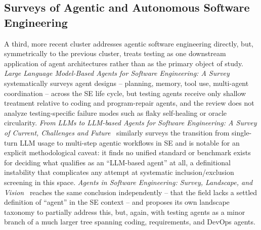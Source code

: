 \subsection{Surveys of Agentic and Autonomous Software Engineering}
\label{subsec:prior-surveys-agentic}

A third, more recent cluster addresses agentic software engineering
directly, but, symmetrically to the previous cluster, treats testing
as one downstream application of agent architectures rather than as
the primary object of study. \emph{Large Language
Model-Based Agents for Software Engineering: A Survey}~\cite{slr0042024} systematically
surveys agent designs -- planning, memory, tool use, multi-agent
coordination -- across the SE life cycle, but testing agents receive
only shallow treatment relative to coding and program-repair agents,
and the review does not analyze testing-specific failure modes such
as flaky self-healing or oracle circularity. \emph{From LLMs to LLM-based Agents for Software Engineering: A
Survey of Current, Challenges and Future}~\cite{slr0052024} similarly surveys the
transition from single-turn LLM usage to multi-step agentic workflows
in SE and is notable for an explicit methodological caveat: it finds
no unified standard or benchmark exists for deciding what qualifies as
an ``LLM-based agent'' at all, a definitional instability that
complicates any attempt at systematic inclusion/exclusion screening
in this space. \emph{Agents in Software
Engineering: Survey, Landscape, and Vision}~\cite{slr0062024} reaches the same
conclusion independently -- that the field lacks a settled definition
of ``agent'' in the SE context -- and proposes its own landscape
taxonomy to partially address this, but, again, with testing agents as
a minor branch of a much larger tree spanning coding, requirements,
and DevOps agents.

